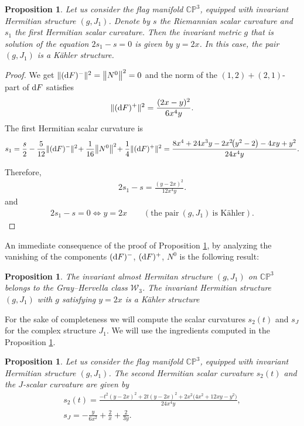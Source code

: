 \documentclass[10pt,a4paper]{amsart}
\numberwithin{equation}{section}
\newtheorem{Proposition}[Theorem]{Proposition}
 { \theoremstyle{definition}
\newtheorem{Definition}[Theorem]{Definition}
\newtheorem{Question}[Theorem]{Question}
\newtheorem*{Notation}{Notation}
\newtheorem{Example}[Theorem]{Example}
\newtheorem{Remark}[Theorem]{Remark} }
\begin{document}
\begin{Proposition}\label{prop-cp3-j1}
Let us consider the flag manifold $\mathbb{CP}^3$, equipped with invariant Hermitian structure $(g, J_{1})$. Denote by $s$ the Riemannian scalar curvature and $s_1$ the first Hermitian scalar curvature. Then the invariant metric $g$ that is solution of the equation $2s_1-s=0$ is given by $y=2x$. In this case, the pair $(g, J_{1})$ is a K\"ahler structure.
\end{Proposition}
\begin{proof}
We get $\|({\rm d}F)^{-}\|^{2}=\big\|N^{0}\big\|^{2}=0$ and the norm of the $(1,2)+(2,1)$-part of ${\rm d}F$ satisfies
\begin{gather*}
\|({\rm d}F)^{+}\|^{2}=\dfrac{(2 x - y)^2}{6 x^4 y}.
\end{gather*}
The first Hermitian scalar curvature is
\begin{align*}
s_{1}=\dfrac{s}{2}-\dfrac{5}{12}\|({\rm d}F)^{-}\|^{2}\!+\dfrac{1}{16}\big\|N^{0}\big\|^{2}\!+\dfrac{1}{4}\|({\rm d}F)^{+}\|^{2}
=\frac{8 x^4+24 x^3 y-2 x^2\! \big(y^2-2\big)-4 x y+y^2}{24 x^4 y}.
\end{align*}

Therefore,
\begin{gather*}
2s_{1}-s=\frac{(y-2 x)^2}{12 x^4 y}.
\end{gather*}
and
\begin{gather*}
2s_{1}-s=0\Leftrightarrow y=2x \qquad (\text{the pair}\ (g, J_1) \ \text{is K\"ahler}).\tag*{\qed}
\end{gather*}
\renewcommand{\qed}{}
\end{proof}


An immediate consequence of the proof of Proposition \ref{prop-cp3-j1}, by analyzing the vanishing of the components $({\rm d}F)^{-}$, $({\rm d}F)^{+}$, $N^0$ is the following result:
\begin{Proposition}
The invariant almost Hermitan structure $(g, J_{1})$ on $\mathbb{CP}^3$ belongs to the Gray--Hervella class $\mathcal{W}_{3}$. The invariant Hermitian structure $(g, J_{1})$ with $g$ satisfying $y=2x$ is a K\"ahler structure
\end{Proposition}

For the sake of completeness we will compute the scalar curvatures $s_2(t)$ and $s_J$ for the complex structure $J_1$. We will use the ingredients computed in the Proposition \ref{prop-cp3-j1}.

\begin{Proposition}
Let us consider the flag manifold $\mathbb{CP}^3$, equipped with invariant Hermitian structure $(g, J_{1})$. The second Hermitian scalar curvature $s_2(t)$ and the $J$-scalar curvature are given by
\begin{gather*}
s_{2}(t)=\frac{-t^2 (y-2 x)^2+2 t (y-2 x)^2+2 x^2 \big(4 x^2+12 x y-y^2\big)}{24 x^4 y},
\\
s_{J}=-\frac{y}{6 x^2}+\frac{2}{x}+\frac{2}{3 y}.
\end{gather*}
\end{Proposition}
\end{document}
